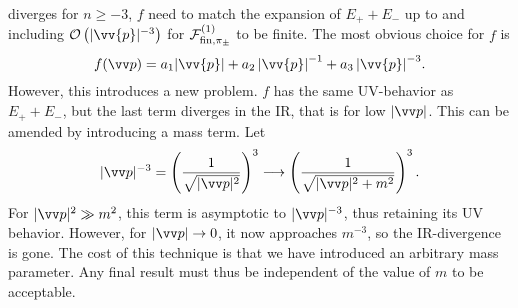 diverges for $n \geq -3$, $f$ need to match the expansion of $E_+ + E_-$ up to and including $\Oh[-3]{|\vv{p}|}$ for $\mathcal{F}^{(1)}_{\mathrm{fin}, \pi_\pm }$ to be finite.
The most obvious choice for $f$ is
\begin{equation}
    f(\vv p) 
    = a_1  \abs{\vv{p}} + a_2 \, {\abs{\vv{p}}}^{-1} + a_3 \, {\abs{\vv{p}}}^{-3}.
\end{equation}
However, this introduces a new problem.
$f$ has the same UV-behavior as $E_+ + E_-$, but the last term diverges in the IR, that is for low $|\vv p|$.
This can be amended by introducing a mass term.
Let
\begin{equation}
    |\vv p|^{-3} 
    = 
    \left(\frac{1}{\sqrt{|\vv p|^2}}\right)^3 
    \longrightarrow 
    \left(\frac{1}{\sqrt{|\vv p|^2 + m^2}}\right)^3.
\end{equation}
For $|\vv p|^2 \gg m^2$, this term is asymptotic to $|\vv p|^{-3}$, thus retaining its UV behavior.
However, for $|\vv p| \rightarrow 0$, it now approaches $m^{-3}$, so the IR-divergence is gone.
The cost of this technique is that we have introduced an arbitrary mass parameter.
Any final result must thus be independent of the value of $m$ to be acceptable.

